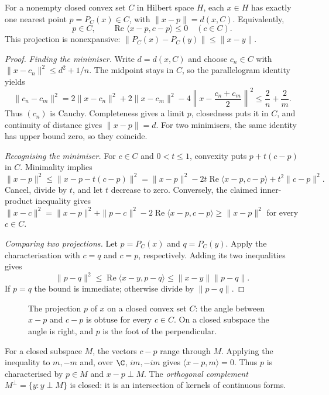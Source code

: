 \begin{theorem}\label{thm:projection}
For a nonempty closed convex set $C$ in Hilbert space $H$, each $x\in H$ has exactly one nearest point $p=P_C(x)\in C$, with $\|x-p\|=d(x,C)$. Equivalently,
\[p\in C,\qquad\operatorname{Re}\langle x-p,c-p\rangle\le0\quad(c\in C).\]
This projection is nonexpansive: $\|P_C(x)-P_C(y)\|\le\|x-y\|$.
\end{theorem}
\begin{proof}
\emph{Finding the minimiser.} Write $d=d(x,C)$ and choose $c_n\in C$ with $\|x-c_n\|^2\le d^2+1/n$. The midpoint stays in $C$, so the parallelogram identity yields
\[\|c_n-c_m\|^2=2\|x-c_n\|^2+2\|x-c_m\|^2-4\left\|x-\frac{c_n+c_m}2\right\|^2\le\frac2n+\frac2m.\]
Thus $(c_n)$ is Cauchy. Completeness gives a limit $p$, closedness puts it in $C$, and continuity of distance gives $\|x-p\|=d$. For two minimisers, the same identity has upper bound zero, so they coincide.

\emph{Recognising the minimiser.} For $c\in C$ and $0<t\le1$, convexity puts $p+t(c-p)$ in $C$. Minimality implies
\[\|x-p\|^2\le\|x-p-t(c-p)\|^2=\|x-p\|^2-2t\operatorname{Re}\langle x-p,c-p\rangle+t^2\|c-p\|^2.\]
Cancel, divide by $t$, and let $t$ decrease to zero. Conversely, the claimed inner-product inequality gives $\|x-c\|^2=\|x-p\|^2+\|p-c\|^2-2\operatorname{Re}\langle x-p,c-p\rangle\ge\|x-p\|^2$ for every $c\in C$.

\emph{Comparing two projections.} Let $p=P_C(x)$ and $q=P_C(y)$. Apply the characterisation with $c=q$ and $c=p$, respectively. Adding its two inequalities gives
\[\|p-q\|^2\le\operatorname{Re}\langle x-y,p-q\rangle\le\|x-y\|\|p-q\|.\]
If $p=q$ the bound is immediate; otherwise divide by $\|p-q\|$.
\end{proof}

\begin{figure}[ht]
\centering
{}
\caption{The projection $p$ of $x$ on a closed convex set $C$: the angle between $x-p$ and $c-p$ is obtuse for every $c\in C$. On a closed subspace the angle is right, and $p$ is the foot of the perpendicular.}
\label{fig:projection}
\end{figure}

For a closed subspace $M$, the vectors $c-p$ range through $M$. Applying the inequality to $m,-m$ and, over $\C$, $im,-im$ gives $\langle x-p,m\rangle=0$. Thus $p$ is characterised by $p\in M$ and $x-p\perp M$. The \emph{orthogonal complement} $M^\perp=\{y:y\perp M\}$ is closed: it is an intersection of kernels of continuous forms.

